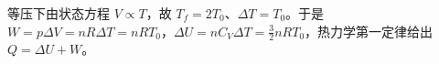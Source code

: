 等压下由状态方程 $V\propto T$，故 $T_f=2T_0$、$\Delta T=T_0$。于是 $W=p\Delta V=nR\Delta T=nRT_0$，$\Delta U=nC_V\Delta T=\tfrac32nRT_0$，热力学第一定律给出 $Q=\Delta U+W$。
